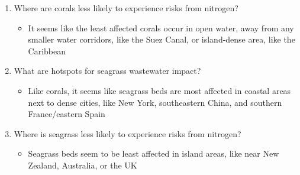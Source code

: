 \documentclass[12pt]{article}
\begin{document}
\begin{enumerate}
\begin{itemize}
    \end{itemize}

  \item Where are corals less likely to experience risks from nitrogen?

    \begin{itemize}

      \item It seems like the least affected corals occur in open water, away from any smaller water corridors, like the Suez Canal, or island-dense area, like the Caribbean

    \end{itemize}

  \item What are hotspots for seagrass wastewater impact?

    \begin{itemize}

      \item Like corals, it seems like seagrass beds are most affected in coastal areas next to dense cities, like New York, southeastern China, and southern France/eastern Spain

    \end{itemize}

  \item Where is seagrass less likely to experience risks from nitrogen? 

    \begin{itemize}

      \item Seagrass beds seem to be least affected in island areas, like near New Zealand, Australia, or the UK
        
    \end{itemize}

\end{enumerate}
\end{document}
